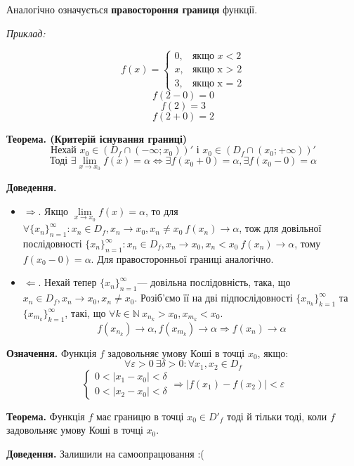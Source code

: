 \documentclass[12pt]{report}
\begin{document}
Аналогічно означується \textbf{правостороння границя} функції.

\textit{Приклад:}

$$f(x) = \begin{cases} 0, & \textrm{якщо } x < 2
\\x, & \textrm{якщо x > 2}
\\3, & \textrm{якщо x = 2}\end{cases}$$
$$f(2-0) = 0$$
$$f(2) = 3$$
$$f(2+0) = 2$$

\textbf{Теорема. (Критерій існування границі)}
$$\textrm{Нехай } x_0 \in (D_f \cap (-\infty; x_0))' \textrm{ і } x_0 \in (D_f \cap (x_0; +\infty))'$$
$$\textrm{Тоді } \exists \lim_{x \to x_0}f(x) = \alpha \Longleftrightarrow \exists f(x_0 + 0) = \alpha, \exists f(x_0 - 0) = \alpha$$

\textbf{Доведення.}
\begin{itemize}
    \item $\Longrightarrow$. Якщо $\lim\limits_{x \to x_0}f(x) = \alpha$, то для $\forall \{ x_n \}_{n=1}^{\infty} : x_n \in D_f, x_n \to x_0, x_n \neq x_0 \  f(x_n) \to \alpha$, тож для довільної послідовності $ \{ x_n \}_{n=1}^{\infty} : x_n \in D_f, x_n \to x_0, x_n < x_0 \  f(x_n) \to \alpha$, тому $f(x_0 - 0) = \alpha$. Для правосторонньої границі аналогічно.
    \item $\Longleftarrow$. Нехай тепер $\{ x_n \}_{n=1}^{\infty}$--- довільна послідовність, така, що $x_n \in D_f, x_n \to x_0, x_n \neq x_0$. Розіб'ємо її на дві підпослідовності $\{ x_{n_k} \}_{k=1}^{\infty}$ та $\{ x_{m_k} \}_{k=1}^{\infty}$, такі, що $\forall k \in \mathbb{N} \ x_{n_k} > x_0, x_{m_k} < x_0$.
    $$f(x_{n_k}) \to \alpha, f(x_{m_k}) \to \alpha \Longrightarrow f(x_n) \to \alpha$$
\end{itemize}

\textbf{Означення.} Функція $f$ задовольняє умову Коші в точці $x_0$, якщо:
$$\forall \varepsilon > 0 \ \exists \delta > 0 : \forall x_1, x_2 \in D_f$$
$$\begin{cases}
   0 < |x_1 - x_0| < \delta \\ 0 < |x_2 - x_0| < \delta
   \end{cases} \Longrightarrow |f(x_1) - f(x_2)| < \varepsilon$$

\vspace{5mm}

\textbf{Теорема.} Функція $f$ має границю в точці $x_0 \in D'_f$ тоді й тільки тоді, коли $f$ задовольняє умову Коші в точці $x_0$.


\textbf{Доведення.} Залишили на самоопрацювання :(
\end{document}
